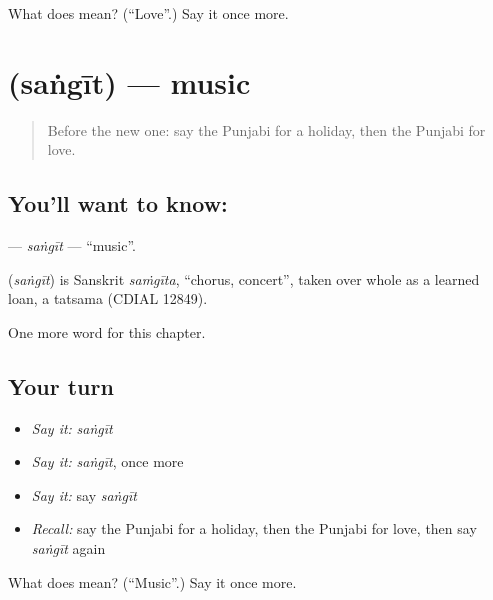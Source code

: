 \begin{tcolorbox}[breakable,colback=teal!4,colframe=teal!35!black,title={Before you move on}]
What does  mean? (\textquotedblleft{}Love\textquotedblright{}.) Say it once more.
\end{tcolorbox}
\section[\texorpdfstring{\pa{ਸੰਗੀਤ} (saṅgīt)}{ਸੰਗੀਤ (saṅgīt)}]{ (saṅgīt) — music}

\label{lesson:PA-C98-sangit}



\begin{quote}
Before the new one: say the Punjabi for a holiday, then the Punjabi for love.
\end{quote}

\subsection*{You'll want to know: }
\textbf{} — \emph{saṅgīt} — \textquotedblleft{}music\textquotedblright{}.

\begin{cousinweb}
\textbf{} (\emph{saṅgīt}) is Sanskrit \emph{saṁgīta}, \textquotedblleft{}chorus, concert\textquotedblright{}, taken over whole as a learned loan, a tatsama (CDIAL 12849).
\end{cousinweb}

\begin{grammarlens}[title={What you've built}]
One more word for this chapter.
\end{grammarlens}

\subsection*{Your turn}
\begin{itemize}
\raggedright
  \item \emph{Say it:} \emph{saṅgīt}
  \item \emph{Say it:} \emph{saṅgīt}, once more
  \item \emph{Say it:} say \emph{saṅgīt}
  \item \emph{Recall:} say the Punjabi for a holiday, then the Punjabi for love, then say \emph{saṅgīt} again
\end{itemize}

\begin{tcolorbox}[breakable,colback=teal!4,colframe=teal!35!black,title={Before you move on}]
What does  mean? (\textquotedblleft{}Music\textquotedblright{}.) Say it once more.
\end{tcolorbox}
